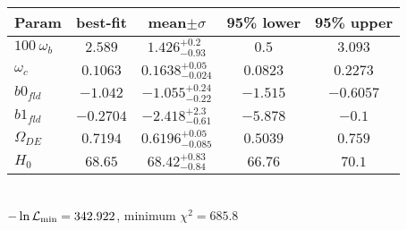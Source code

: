 \begin{tabular}{|l|c|c|c|c|} 
 \hline 
Param & best-fit & mean$\pm\sigma$ & 95\% lower & 95\% upper \\ \hline 
$100~\omega_{b }$ &$2.589$ & $1.426_{-0.93}^{+0.2}$ & $0.5$ & $3.093$ \\ 
$\omega_c$ &$0.1063$ & $0.1638_{-0.024}^{+0.05}$ & $0.0823$ & $0.2273$ \\ 
$b0_{fld }$ &$-1.042$ & $-1.055_{-0.22}^{+0.24}$ & $-1.515$ & $-0.6057$ \\ 
$b1_{fld }$ &$-0.2704$ & $-2.418_{-0.61}^{+2.3}$ & $-5.878$ & $-0.1$ \\ 
$\Omega_{DE}$ &$0.7194$ & $0.6196_{-0.085}^{+0.05}$ & $0.5039$ & $0.759$ \\ 
$H_{0 }$ &$68.65$ & $68.42_{-0.84}^{+0.83}$ & $66.76$ & $70.1$ \\ 
\hline 
 \end{tabular} \\ 
$-\ln{\cal L}_\mathrm{min} =342.922$, minimum $\chi^2=685.8$ \\ 
